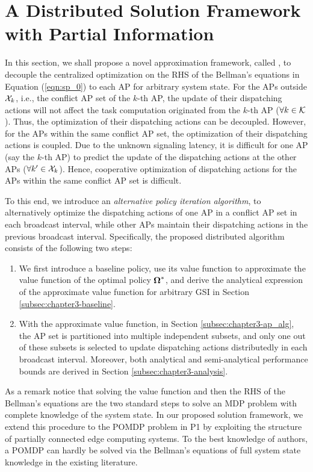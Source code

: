 \section{A Distributed Solution Framework with Partial Information}
\label{sec:chapter3-algorithm}
In this section, we shall propose a novel approximation framework, called {\Dalgname}, to decouple the centralized optimization on the RHS of the Bellman's equations in Equation (\ref{eqn:sp_0}) to each AP for arbitrary system state.
For the APs outside $\mathcal{X}_{k}$, i.e., the conflict AP set of the $k$-th AP, the update of their dispatching actions will not affect the task computation originated from the $k$-th AP ($\forall k\in\mathcal{K}$).
Thus, the optimization of their dispatching actions can be decoupled.
However, for the APs within the same conflict AP set, the optimization of their dispatching actions is coupled.
Due to the unknown signaling latency, it is difficult for one AP (say the $k$-th AP) to predict the update of the dispatching actions at the other APs ($\forall k' \in\mathcal{X}_{k}$).
Hence, cooperative optimization of dispatching actions for the APs within the same conflict AP set is difficult.

To this end, we introduce an \emph{alternative policy iteration algorithm}, to alternatively optimize the dispatching actions of one AP in a conflict AP set in each broadcast interval, while other APs maintain their dispatching actions in the previous broadcast interval.
Specifically, the proposed distributed algorithm consists of the following two steps:
\begin{enumerate}
    \item We first introduce a baseline policy, use its value function to approximate the value function of the optimal policy $\boldsymbol{\Omega}^*$, and derive the analytical expression of the approximate value function for arbitrary GSI in Section \ref{subsec:chapter3-baseline}.
    \item With the approximate value function, in Section \ref{subsec:chapter3-ap_alg}, the AP set is partitioned into multiple independent subsets,
    and only one out of these subsets is selected to update dispatching actions distributedly in each broadcast interval.
    Moreover, both analytical and semi-analytical performance bounds are derived in Section \ref{subsec:chapter3-analysis}.
\end{enumerate}
As a remark notice that solving the value function and then the RHS of the Bellman's equations are the two standard steps to solve an MDP problem with complete knowledge of the system state.
In our proposed solution framework, we extend this procedure to the POMDP problem in P1 by exploiting the structure of partially connected edge computing systems.
To the best knowledge of authors, a POMDP can hardly be solved via the Bellman's equations of full system state knowledge in the existing literature.

